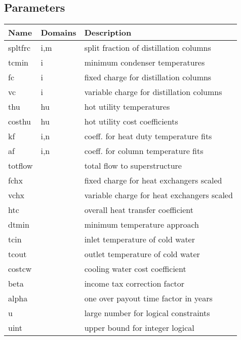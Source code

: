 \documentclass[11pt]{article}
\begin{document}
\subsection*{Parameters}
\begin{tabularx}{\textwidth}{| l | l | X |}
\hline
\textbf{Name} & \textbf{Domains} & \textbf{Description}\\
\hline
\endhead

spltfrc & i,m & split fraction of distillation columns\\
tcmin & i & minimum condenser temperatures\\
fc & i & fixed charge for distillation columns\\
vc & i & variable charge for distillation columns\\
thu & hu & hot utility temperatures\\
costhu & hu & hot utility cost coefficients\\
kf & i,n & coeff. for heat duty temperature fits\\
af & i,n & coeff. for column temperature fits\\
totflow &  & total flow to superstructure\\
fchx &  & fixed charge for heat exchangers scaled\\
vchx &  & variable charge for heat exchangers scaled\\
htc &  & overall heat transfer coefficient\\
dtmin &  & minimum temperature approach\\
tcin &  & inlet temperature of cold water\\
tcout &  & outlet temperature of cold water\\
costcw &  & cooling water cost coefficient\\
beta &  & income tax correction factor\\
alpha &  & one over payout time factor in years\\
u &  & large number for logical constraints\\
uint &  & upper bound for integer logical\\
\hline
\end{tabularx}
\end{document}
